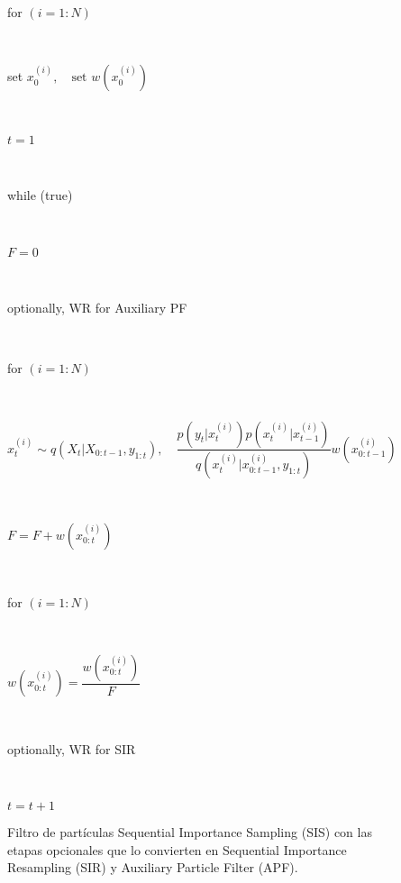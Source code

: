 \begin{figure}[ht]
    \centering
    \begin{tcolorbox}[colframe=black, colback=white, boxrule=0.5pt, width=0.8\textwidth, sharp corners]
        \parbox[t]{\linewidth}{for $(i=1:N)$} \\[0.5em]
        \parbox[t]{\linewidth}{\hspace{1em}set $x_0^{(i)}, \quad \text{set } w\left(x_0^{(i)}\right)$} \\[0.5em]
        \parbox[t]{\linewidth}{$t = 1$} \\[0.5em]
        \parbox[t]{\linewidth}{while (true)} \\[0.5em]
        \parbox[t]{\linewidth}{\hspace{1em} $F=0$} \\[0.5em]
        \parbox[t]{\linewidth}{\hspace{1em} optionally, WR for Auxiliary PF}\\[0.5em]
        \parbox[t]{\linewidth}{\hspace{1em} for $(i=1:N)$}\\[0.5em]
        \parbox[t]{\linewidth}{\hspace{2em} $x_t^{(i)} \sim q\left(X_{t}|X_{0:t-1},y_{1:t}\right), \quad \dfrac{p\left(y_{t}|x_{t}^{(i)}\right)p\left(x_{t}^{(i)}|x_{t-1}^{(i)}\right)}{q\left(x_{t}^{(i)}|x_{0:t-1}^{(i)},y_{1:t}\right)}w\left(x_{0:t-1}^{(i)}\right)$}\\[0.5em]
        \parbox[t]{\linewidth}{\hspace{2em} $F = F+w\left(x_{0:t}^{(i)}\right)$}\\[0.5em]
        \parbox[t]{\linewidth}{\hspace{1em} for $(i=1:N)$}\\[0.5em]
        \parbox[t]{\linewidth}{\hspace{2em} $w\left(x_{0:t}^{(i)}\right) = \dfrac{w\left(x_{0:t}^{(i)}\right)}{F}$}\\[0.5em]
        \parbox[t]{\linewidth}{\hspace{1em} optionally, WR for SIR}\\[0.5em]
        \parbox[t]{\linewidth}{\hspace{1em} $t=t+1$}
    \end{tcolorbox}
    \caption{Filtro de partículas Sequential Importance Sampling (SIS) con las
etapas opcionales que lo convierten en Sequential Importance Resampling (SIR) y
Auxiliary Particle Filter (APF).}
    \label{fig:3.8}
\end{figure}


